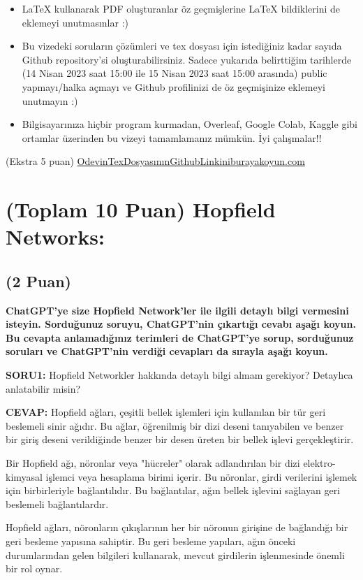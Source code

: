 \documentclass[11pt]{article}
\begin{document}
\begin{itemize}
    \item LaTeX kullanarak PDF oluşturanlar öz geçmişlerine LaTeX bildiklerini de eklemeyi unutmasınlar :)
    \item Bu vizedeki soruların çözümleri ve tex dosyası için istediğiniz kadar sayıda Github repository'si oluşturabilirsiniz. Sadece yukarıda belirttiğim tarihlerde (14 Nisan 2023 saat 15:00 ile 15 Nisan 2023 saat 15:00 arasında) public yapmayı/halka açmayı ve Github profilinizi de öz geçmişinize eklemeyi unutmayın :)
    \item Bilgisayarınıza hiçbir program kurmadan, Overleaf, Google Colab, Kaggle gibi ortamlar üzerinden bu vizeyi tamamlamanız mümkün. İyi çalışmalar!!
\end{itemize}

(Ekstra 5 puan) \url{OdevinTexDosyasınınGithubLinkiniburayakoyun.com}

\newpage
\section{(Toplam 10 Puan) Hopfield Networks:}

\subsection{(2 Puan)} \textbf{ChatGPT’ye size Hopfield Network’ler ile ilgili detaylı bilgi vermesini isteyin. Sorduğunuz soruyu, ChatGPT'nin çıkartığı cevabı aşağı koyun. Bu cevapta anlamadığınız terimleri de ChatGPT’ye sorup, sorduğunuz soruları ve ChatGPT’nin verdiği cevapları da sırayla aşağı koyun.}

\textbf{SORU1:} Hopfield Networkler hakkında detaylı bilgi almam gerekiyor? Detaylıca anlatabilir misin?

\textbf{CEVAP:} Hopfield ağları, çeşitli bellek işlemleri için kullanılan bir tür geri beslemeli sinir ağıdır. Bu ağlar, öğrenilmiş bir dizi deseni tanıyabilen ve benzer bir giriş deseni verildiğinde benzer bir desen üreten bir bellek işlevi gerçekleştirir.

Bir Hopfield ağı, nöronlar veya "hücreler" olarak adlandırılan bir dizi elektro-kimyasal işlemci veya hesaplama birimi içerir. Bu nöronlar, girdi verilerini işlemek için birbirleriyle bağlantılıdır. Bu bağlantılar, ağın bellek işlevini sağlayan geri beslemeli bağlantılardır.

Hopfield ağları, nöronların çıkışlarının her bir nöronun girişine de bağlandığı bir geri besleme yapısına sahiptir. Bu geri besleme yapıları, ağın önceki durumlarından gelen bilgileri kullanarak, mevcut girdilerin işlenmesinde önemli bir rol oynar.
\end{document}
